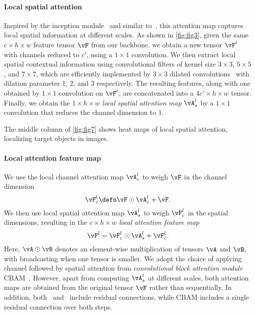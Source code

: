 
\paragraph{Local spatial attention}

Inspired by the inception module~\cite{Szegedy01} and similar to~\cite{Kim01}, this attention map captures local spatial information at different scales. As shown in \autoref{fig:fig3},
given the same $c\times h\times w$ feature tensor $\vF$ from our backbone, we obtain a new tensor $\vF'$ with channels reduced to $c'$, using a ${1 \times 1}$ convolution. We then extract local spatial contextual information using convolutional filters of kernel size ${3\times 3}$, ${5\times 5}$, and ${7\times 7}$, which are efficiently implemented by ${3\times 3}$ dilated convolutions~\cite{chen2017rethinking,Yu_2017_CVPR} with dilation parameter 1, 2, and 3 respectively. The resulting features, along with one obtained by ${1\times 1}$ convolution on $\vF'$, are concatenated into a $4c' \times h \times w$ tensor. Finally, we obtain the $1 \times h \times w$ \emph{local spatial attention map} $\vA_s^l$ by a ${1\times 1}$ convolution that reduces the channel dimension to $1$.

The middle column of \autoref{fig:fig7} shows heat maps of local spatial attention, localizing target objects in images.


\paragraph{Local attention feature map}

We use the local channel attention map $\vA_c^l$ to weigh $\vF$ in the channel dimension
\begin{equation}
	\vF_c^l \defn \vF \odot \vA_c^l + \vF.
\label{eq:eq3}
\end{equation}
We then use local spatial attention map $\vA_s^l$ to weigh $\vF_c^l$ in the spatial dimensions, resulting in the $c \times h \times w$ \emph{local attention feature map}
\begin{equation}
	\vF^l = \vF_c^l \odot \vA_s^l + \vF_c^l.
\label{eq:eq3-1}
\end{equation}
Here, $\vA \odot \vB$ denotes an element-wise multiplication of tensors $\vA$ and $\vB$, with broadcasting when one tensor is smaller. We adopt the choice of applying channel followed by spatial attention from \emph{convolutional block attention module} CBAM~\cite{woo01}. However, apart from computing $\vA_s^l$ at different scales, both attention maps are obtained from the original tensor $\vF$ rather than sequentially. In addition, both~ and~ include residual connections, while CBAM includes a single residual connection over both steps.

